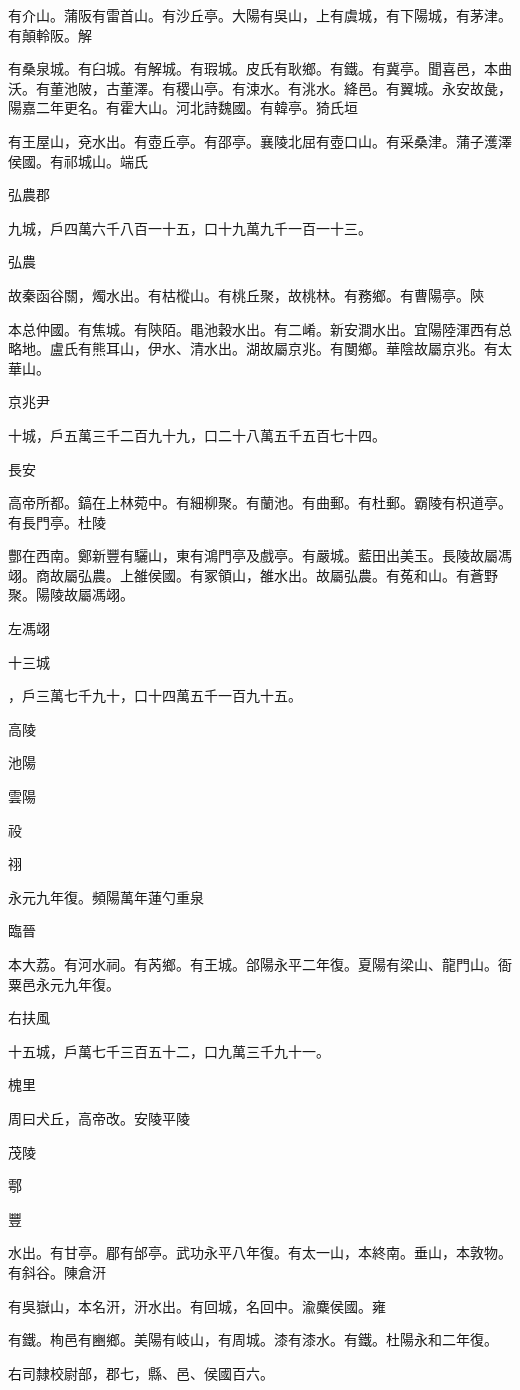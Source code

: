 \begin{pinyinscope}
有介山。蒲阪有雷首山。有沙丘亭。大陽有吳山，上有虞城，有下陽城，有茅津。有顛軨阪。解

有桑泉城。有臼城。有解城。有瑕城。皮氏有耿鄉。有鐵。有冀亭。聞喜邑，本曲沃。有董池陂，古董澤。有稷山亭。有涑水。有洮水。絳邑。有翼城。永安故彘，陽嘉二年更名。有霍大山。河北詩魏國。有韓亭。猗氏垣

有王屋山，兗水出。有壺丘亭。有邵亭。襄陵北屈有壺口山。有采桑津。蒲子濩澤侯國。有祁城山。端氏

弘農郡

九城，戶四萬六千八百一十五，口十九萬九千一百一十三。

弘農

故秦函谷關，燭水出。有枯樅山。有桃丘聚，故桃林。有務鄉。有曹陽亭。陝

本总仲國。有焦城。有陝陌。黽池穀水出。有二崤。新安澗水出。宜陽陸渾西有总略地。盧氏有熊耳山，伊水、清水出。湖故屬京兆。有閺鄉。華陰故屬京兆。有太華山。

京兆尹

十城，戶五萬三千二百九十九，口二十八萬五千五百七十四。

長安

高帝所都。鎬在上林菀中。有細柳聚。有蘭池。有曲郵。有杜郵。霸陵有枳道亭。有長門亭。杜陵

酆在西南。鄭新豐有驪山，東有鴻門亭及戲亭。有嚴城。藍田出美玉。長陵故屬馮翊。商故屬弘農。上雒侯國。有冢領山，雒水出。故屬弘農。有菟和山。有蒼野聚。陽陵故屬馮翊。

左馮翊

十三城

，戶三萬七千九十，口十四萬五千一百九十五。

高陵

池陽

雲陽

祋

祤

永元九年復。頻陽萬年蓮勺重泉

臨晉

本大荔。有河水祠。有芮鄉。有王城。郃陽永平二年復。夏陽有梁山、龍門山。衙粟邑永元九年復。

右扶風

十五城，戶萬七千三百五十二，口九萬三千九十一。

槐里

周曰犬丘，高帝改。安陵平陵

茂陵

鄠

豐

水出。有甘亭。郿有邰亭。武功永平八年復。有太一山，本終南。垂山，本敦物。有斜谷。陳倉汧

有吳嶽山，本名汧，汧水出。有回城，名回中。渝麋侯國。雍

有鐵。栒邑有豳鄉。美陽有岐山，有周城。漆有漆水。有鐵。杜陽永和二年復。

右司隸校尉部，郡七，縣、邑、侯國百六。


\end{pinyinscope}